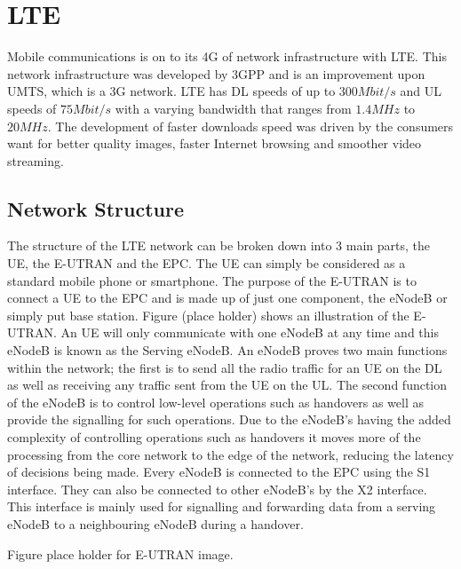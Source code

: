 \chapter{LTE}\label{lte}
Mobile communications is on to its \ac{4G} of network infrastructure with \ac{LTE}. This network infrastructure was developed by 3GPP and is an improvement upon \ac{UMTS}, which is a \ac{3G} network. \ac{LTE} has \ac{DL} speeds of up to $300 Mbit/s$ and \ac{UL} speeds of $75 Mbit/s$ with a varying bandwidth that ranges from $1.4 MHz$ to $20 MHz$. The development of faster downloads speed was driven by the consumers want for better quality images, faster Internet browsing and smoother video streaming.~\cite{cox2012introduction}

\section{Network Structure}\label{network structure}
The structure of the LTE network can be broken down into 3 main parts, the \ac{UE}, the \ac{E-UTRAN} and the \ac{EPC}. The UE can simply be considered as a standard mobile phone or smartphone. The purpose of the E-UTRAN is to connect a UE to the EPC and is made up of just one component, the \ac{eNodeB} or simply put base station. Figure (place holder) shows an illustration of the E-UTRAN. An UE will only communicate with one eNodeB at any time and this eNodeB is known as the Serving eNodeB. An eNodeB proves two main functions within the network; the first is to send all the radio traffic for an UE on the DL as well as receiving any traffic sent from the UE on the UL. The second function of the eNodeB is to control low-level operations such as handovers as well as provide the signalling for such operations. Due to the eNodeB's having the added complexity of controlling operations such as handovers it moves more of the processing from the core network to the edge of the network, reducing the latency of decisions being made. Every eNodeB is connected to the EPC using the S1 interface. They can also be connected to other eNodeB's by the X2 interface. This interface is mainly used for signalling and forwarding data from a serving eNodeB to a neighbouring eNodeB during a handover.

Figure place holder for E-UTRAN image.

